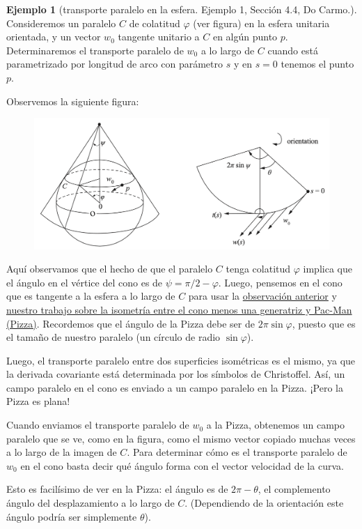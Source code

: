 \documentclass[spanish]{book}
\theoremstyle{definition}
\newtheorem*{ejem}{Ejemplo}
\begin{document}
\begin{ejem}[transporte paralelo en la esfera. Ejemplo 1, Sección 4.4, Do Carmo.]
	Consideremos un paralelo $C$ de colatitud $\varphi$ (ver figura) en la esfera unitaria orientada, y un vector $w_0$ tangente unitario a $C$ en algún punto $p$. Determinaremos el transporte paralelo de $w_0$ a lo largo de $C$ cuando está parametrizado por longitud de arco con parámetro $s$ y en $s=0$ tenemos el punto $p$.
	
	Observemos la siguiente figura:
	\begin{figure}[H]
		\centering
		\includegraphics[width=0.7\linewidth]{gauss7}
	\end{figure}
	Aquí observamos que el hecho de que el paralelo $C$ tenga colatitud $\varphi$ implica que el ángulo en el vértice del cono es de $\psi=\pi/2-\varphi$. Luego, pensemos en el cono que es tangente a la esfera a lo largo de $C$ para usar la \hyperref[obs:superficies-tangentes]{observación anterior} y \hyperref[cono-pac-man]{nuestro trabajo sobre la isometría entre el cono menos una generatriz y Pac-Man (Pizza)}. Recordemos que el ángulo de la Pizza debe ser de $2\pi\sin\varphi$, puesto que es el tamaño de nuestro paralelo (un círculo de radio $\sin\varphi$).
	
	Luego, el transporte paralelo entre dos superficies isométricas es el mismo, ya que la derivada covariante está determinada por los símbolos de Christoffel. Así, un campo paralelo en el cono es enviado a un campo paralelo en la Pizza. ¡Pero la Pizza es plana!
	
	Cuando enviamos el transporte paralelo de $w_0$ a la Pizza, obtenemos un campo paralelo que se ve, como en la figura, como el mismo vector copiado muchas veces a lo largo de la imagen de $C$. Para determinar cómo es el transporte paralelo de $w_0$ en el cono basta decir qué ángulo forma con el vector velocidad de la curva.
	
	Esto es facilísimo de ver en la Pizza: el ángulo es de $2\pi-\theta$, el complemento ángulo del desplazamiento a lo largo de $C$. (Dependiendo de la orientación este ángulo podría ser simplemente $\theta$).
	

\end{ejem}
\end{document}
